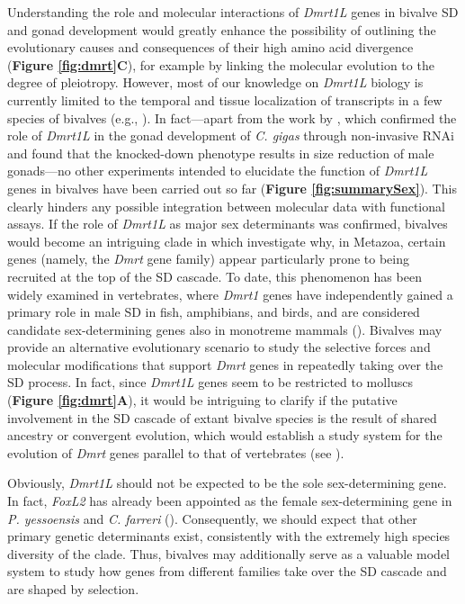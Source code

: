 \documentclass[../main.tex]{subfiles}
\begin{document}
Understanding the role and molecular interactions of \textit{Dmrt1L} genes in bivalve SD and gonad development would greatly enhance the possibility of outlining the evolutionary causes and consequences of their high amino acid divergence (\textbf{Figure \ref{fig:dmrt}C}), for example by linking the molecular evolution to the degree of pleiotropy. However, most of our knowledge on \textit{Dmrt1L} biology is currently limited to the temporal and tissue localization of transcripts in a few species of bivalves (e.g., \textbf{\cite{li2018foxl2,yue2021variance}}). In fact—apart from the work by \textbf{\cite{sun2022examination}}, which confirmed the role of \textit{Dmrt1L} in the gonad development of \textit{C. gigas} through non-invasive RNAi and found that the knocked-down phenotype results in size reduction of male gonads—no other experiments intended to elucidate the function of \textit{Dmrt1L} genes in bivalves have been carried out so far (\textbf{Figure \ref{fig:summarySex}}). This clearly hinders any possible integration between molecular data with functional assays.
If the role of \textit{Dmrt1L} as major sex determinants was confirmed, bivalves would become an intriguing clade in which investigate why, in Metazoa, certain genes (namely, the \textit{Dmrt} gene family) appear particularly prone to being recruited at the top of the SD cascade. To date, this phenomenon has been widely examined in vertebrates, where \textit{Dmrt1} genes have independently gained a primary role in male SD in fish, amphibians, and birds, and are considered candidate sex-determining genes also in monotreme mammals (\textbf{\cite{marshall2010homologies,beukeboom2014evolution,mawaribuchi2019independent}}). Bivalves may provide an alternative evolutionary scenario to study the selective forces and molecular modifications that support \textit{Dmrt} genes in repeatedly taking over the SD process. In fact, since \textit{Dmrt1L} genes seem to be restricted to molluscs (\textbf{Figure \ref{fig:dmrt}A}), it would be intriguing to clarify if the putative involvement in the SD cascade of extant bivalve species is the result of shared ancestry or convergent evolution, which would establish a study system for the evolution of \textit{Dmrt} genes parallel to that of vertebrates (see \textbf{\cite{capel2017vertebrate}}).

Obviously, \textit{Dmrt1L} should not be expected to be the sole sex-determining gene. In fact, \textit{FoxL2} has already been appointed as the female sex-determining gene in \textit{P. yessoensis} and \textit{C. farreri} (\textbf{\cite{han2022ancient}}). Consequently, we should expect that other primary genetic determinants exist, consistently with the extremely high species diversity of the clade. Thus, bivalves may additionally serve as a valuable model system to study how genes from different families take over the SD cascade and are shaped by selection.
\end{document}
